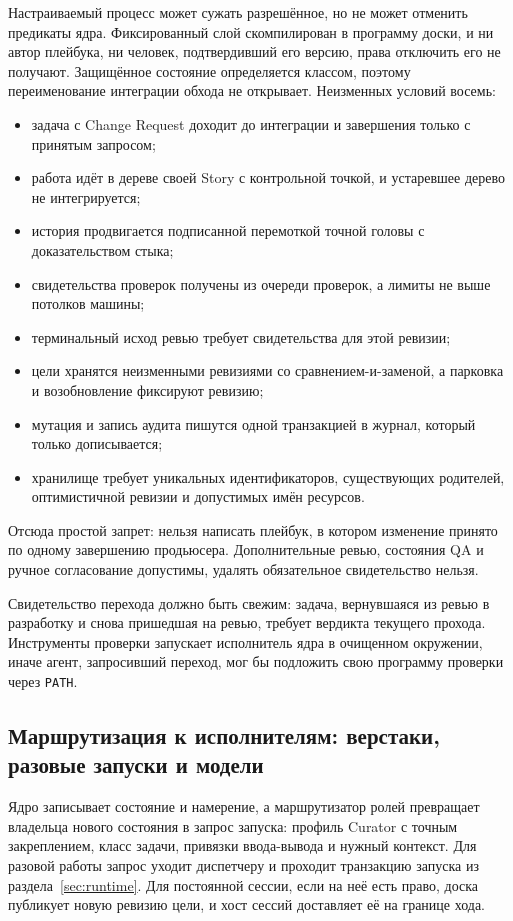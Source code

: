 \documentclass[10pt,a4paper]{article}
\begin{document}
Настраиваемый процесс может сужать разрешённое, но не может отменить предикаты ядра. Фиксированный слой скомпилирован в программу доски, и ни автор плейбука, ни человек, подтвердивший его версию, права отключить его не получают. Защищённое состояние определяется классом, поэтому переименование интеграции обхода не открывает. Неизменных условий восемь:
\begin{itemize}
\item задача с Change Request доходит до интеграции и завершения только с принятым запросом;
\item работа идёт в дереве своей Story с контрольной точкой, и устаревшее дерево не интегрируется;
\item история продвигается подписанной перемоткой точной головы с доказательством стыка;
\item свидетельства проверок получены из очереди проверок, а лимиты не выше потолков машины;
\item терминальный исход ревью требует свидетельства для этой ревизии;
\item цели хранятся неизменными ревизиями со сравнением-и-заменой, а парковка и возобновление фиксируют ревизию;
\item мутация и запись аудита пишутся одной транзакцией в журнал, который только дописывается;
\item хранилище требует уникальных идентификаторов, существующих родителей, оптимистичной ревизии и допустимых имён ресурсов.
\end{itemize}
Отсюда простой запрет: нельзя написать плейбук, в котором изменение принято по одному завершению продьюсера. Дополнительные ревью, состояния QA и ручное согласование допустимы, удалять обязательное свидетельство нельзя.

Свидетельство перехода должно быть свежим: задача, вернувшаяся из ревью в разработку и снова пришедшая на ревью, требует вердикта текущего прохода. Инструменты проверки запускает исполнитель ядра в очищенном окружении, иначе агент, запросивший переход, мог бы подложить свою программу проверки через \texttt{PATH}.

\subsection{Маршрутизация к исполнителям: верстаки, разовые запуски и модели}
\label{sec:routing}

Ядро записывает состояние и намерение, а маршрутизатор ролей превращает владельца нового состояния в запрос запуска: профиль Curator с точным закреплением, класс задачи, привязки ввода-вывода и нужный контекст. Для разовой работы запрос уходит диспетчеру и проходит транзакцию запуска из раздела~\ref{sec:runtime}. Для постоянной сессии, если на неё есть право, доска публикует новую ревизию цели, и хост сессий доставляет её на границе хода.
\end{document}
